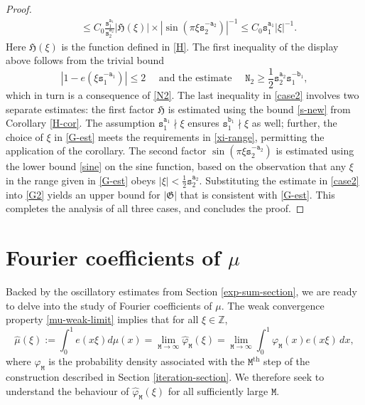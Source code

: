 \documentclass[12pt, twoside]{article}
\theoremstyle{definition}
\numberwithin{equation}{section}
\begin{document}
\begin{proof}
\begin{align}
&\leq C_0 \frac{\mathtt s_1^{\mathtt a_1}}{\mathtt s_2^{\mathtt a_2}} |\mathfrak H(\xi)| \times |\sin(\pi \xi \mathtt s_2^{-\mathtt a_2})|^{-1} 
\leq C_0 \mathtt s_1^{\mathtt a_1} |\xi|^{-1}. \label{case2} 
\end{align} 
Here $\mathfrak H(\xi)$ is the function defined in \eqref{H}. The first inequality of the display above follows from the trivial bound 
\[ |1 - e(\xi \mathtt s_1^{-\mathtt a_1})| \leq 2 \quad \text{ and the estimate } \quad \mathtt N_2 \geq \frac{1}{2} \mathtt s_2^{\mathtt a_2} \mathtt s_1^{-\mathtt b_1}, \] which in turn is a consequence of \eqref{N2}. The last inequality in \eqref{case2} involves two separate estimates: the first factor $\mathfrak H$ is estimated using the bound \eqref{s-new} from Corollary \ref{H-cor}. The assumption $\mathtt s_1^{\mathtt a_1} \nmid \xi$ ensures $\mathtt s_1^{\mathtt b_1} \nmid \xi$ as well; further, the choice of $\xi$ in \eqref{G-est} meets the requirements in \eqref{xi-range}, permitting the application of the corollary. The second factor $\sin(\pi \xi \mathtt s_2^{-\mathtt a_2})$ is estimated using the lower bound \eqref{sine} on the sine function, based on the observation that any $\xi$ in the range given in \eqref{G-est} obeys $|\xi| < \frac{1}{2} \mathtt s_2^{\mathtt a_2}$. Substituting the estimate in \eqref{case2} into \eqref{G2} yields an upper bound for $|\mathfrak G|$ that is consistent with \eqref{G-est}. This completes the analysis of all three cases, and concludes the proof.   
\end{proof} 



\section{Fourier coefficients of $\mu$} \label{mu-Rajchman-section}
Backed by the oscillatory estimates from Section \ref{exp-sum-section}, we are ready to delve into the study of Fourier coefficients of $\mu$.  The weak convergence property \eqref{mu-weak-limit} implies that for all $\xi \in \mathbb Z$, 
\begin{equation} \label{Fourier} 
\widehat{\mu}(\xi) := \int_{0}^1 e(x\xi) d\mu(x) = \lim_{\mathtt M \rightarrow \infty} \widehat{\varphi}_{\mathtt M}(\xi) = \lim_{\mathtt M \rightarrow \infty} \int_{0}^{1} \varphi_{\mathtt M}(x) e(x\xi) \, dx,\end{equation}   
where $\varphi_{\mathtt M}$ is the probability density associated with the $\mathtt M^{\text{th}}$ step of the construction described in Section \ref{iteration-section}. We therefore seek to understand the behaviour of $\widehat{\varphi}_{\mathtt M}(\xi)$ for all sufficiently large $\mathtt M$. 
\end{document}
